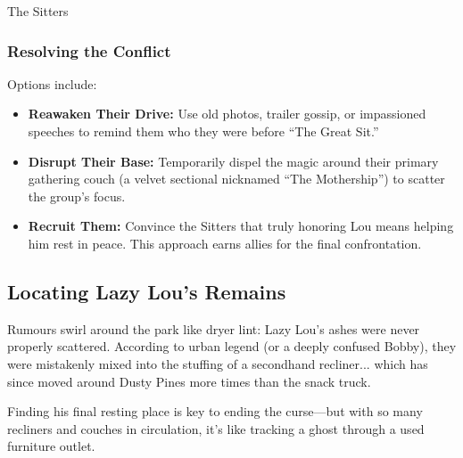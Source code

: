 \begin{multicols}{2}
\begin{NPC}[description={Cursed, Content, Collectively Couch-Bound}]{The Sitters}
    \DamageBox[%
        totalfatigue=2,%
        totalmild=1,totalmoderate=1,totalsevere=0,%
    ]
\end{NPC}

\subsubsection*{Resolving the Conflict}
Options include:
\begin{itemize}
    \item \textbf{Reawaken Their Drive:} Use old photos, trailer gossip, or impassioned speeches to remind them who they were before “The Great Sit.”
    \item \textbf{Disrupt Their Base:} Temporarily dispel the magic around their primary gathering couch (a velvet sectional nicknamed “The Mothership”) to scatter the group’s focus.
    \item \textbf{Recruit Them:} Convince the Sitters that truly honoring Lou means helping him rest in peace. This approach earns allies for the final confrontation.
\end{itemize}


\subsection{Locating Lazy Lou’s Remains}

Rumours swirl around the park like dryer lint: Lazy Lou’s ashes were never properly scattered. According to urban legend (or a deeply confused Bobby), they were mistakenly mixed into the stuffing of a secondhand recliner... which has since moved around Dusty Pines more times than the snack truck.

Finding his final resting place is key to ending the curse—but with so many recliners and couches in circulation, it’s like tracking a ghost through a used furniture outlet.


\end{multicols}
